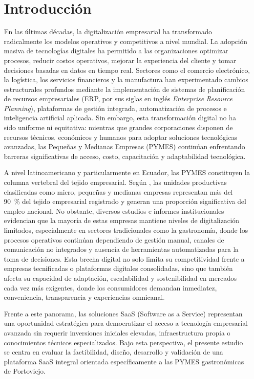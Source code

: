 \chapter{Introducción}

En las últimas décadas, la digitalización empresarial ha transformado radicalmente los modelos operativos y competitivos a nivel mundial. La adopción masiva de tecnologías digitales ha permitido a las organizaciones optimizar procesos, reducir costos operativos, mejorar la experiencia del cliente y tomar decisiones basadas en datos en tiempo real. Sectores como el comercio electrónico, la logística, los servicios financieros y la manufactura han experimentado cambios estructurales profundos mediante la implementación de sistemas de planificación de recursos empresariales (ERP, por sus siglas en inglés \textit{Enterprise Resource Planning}), plataformas de gestión integrada, automatización de procesos e inteligencia artificial aplicada. Sin embargo, esta transformación digital no ha sido uniforme ni equitativa: mientras que grandes corporaciones disponen de recursos técnicos, económicos y humanos para adoptar soluciones tecnológicas avanzadas, las Pequeñas y Medianas Empresas (PYMES) continúan enfrentando barreras significativas de acceso, costo, capacitación y adaptabilidad tecnológica.

A nivel latinoamericano y particularmente en Ecuador, las PYMES constituyen la columna vertebral del tejido empresarial. Según \textcite{INEC2023}, las unidades productivas clasificadas como micro, pequeñas y medianas empresas representan más del 90~\% del tejido empresarial registrado y generan una proporción significativa del empleo nacional. No obstante, diversos estudios e informes institucionales \parencite{Arcotel_2022, DuranMero2024, AyoraRecalde2024} evidencian que la mayoría de estas empresas mantiene niveles de digitalización limitados, especialmente en sectores tradicionales como la gastronomía, donde los procesos operativos continúan dependiendo de gestión manual, canales de comunicación no integrados y ausencia de herramientas automatizadas para la toma de decisiones. Esta brecha digital no solo limita su competitividad frente a empresas tecnificadas o plataformas digitales consolidadas, sino que también afecta su capacidad de adaptación, escalabilidad y sostenibilidad en mercados cada vez más exigentes, donde los consumidores demandan inmediatez, conveniencia, transparencia y experiencias omnicanal.

Frente a este panorama, las soluciones SaaS (Software as a Service) representan una oportunidad estratégica para democratizar el acceso a tecnología empresarial avanzada sin requerir inversiones iniciales elevadas, infraestructura propia o conocimientos técnicos especializados. Bajo esta perspectiva, el presente estudio se centra en evaluar la factibilidad, diseño, desarrollo y validación de una plataforma SaaS integral orientada específicamente a las PYMES gastronómicas de Portoviejo.

